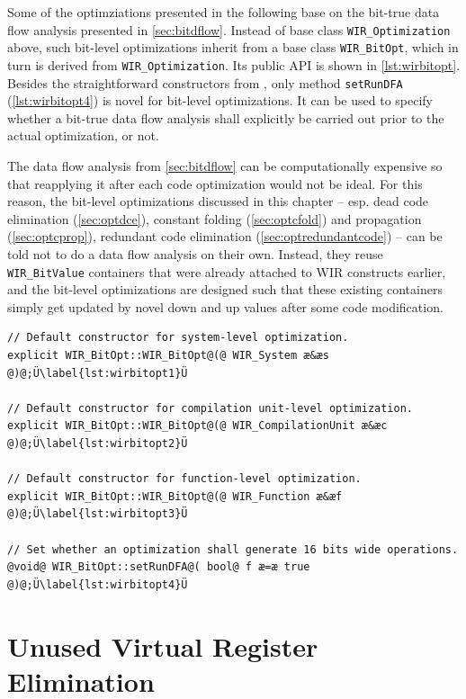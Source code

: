 Some of the optimziations presented in the following base on the bit-true data flow analysis presented in \cref{sec:bitdflow}.
Instead of base class \texttt{WIR\_Optimization} above, such bit-level optimizations inherit from a base class \texttt{WIR\_BitOpt}, which in turn is derived from \texttt{WIR\_Optimization}.
Its public \gls{API} is shown in \cref{lst:wirbitopt}.
Besides the straightforward constructors from , only method \texttt{setRunDFA} (\cref{lst:wirbitopt4}) is novel for bit-level optimizations.
It can be used to specify whether a bit-true data flow analysis shall explicitly be carried out prior to the actual optimization, or not.

The data flow analysis from \cref{sec:bitdflow} can be computationally expensive so that reapplying it after each code optimization would not be ideal.
For this reason, the bit-level optimizations discussed in this chapter -- esp. dead code elimination (\cref{sec:optdce}), constant folding (\cref{sec:optcfold}) and propagation (\cref{sec:optcprop}), redundant code elimination (\cref{sec:optredundantcode}) -- can be told not to do a data flow analysis on their own.
Instead, they reuse \texttt{WIR\_BitValue} containers that were already attached to \gls{WIR} constructs earlier, and the bit-level optimizations are designed such that these existing containers simply get updated by novel down and up values after some code modification.

\begin{lstlisting}[style=code,float=t,caption={Bit-Level Optimization API of Class \texttt{WIR\_BitOpt}},label=lst:wirbitopt]
// Default constructor for system-level optimization.
explicit WIR_BitOpt::WIR_BitOpt@(@ WIR_System æ&æs @)@;Ü\label{lst:wirbitopt1}Ü

// Default constructor for compilation unit-level optimization.
explicit WIR_BitOpt::WIR_BitOpt@(@ WIR_CompilationUnit æ&æc @)@;Ü\label{lst:wirbitopt2}Ü

// Default constructor for function-level optimization.
explicit WIR_BitOpt::WIR_BitOpt@(@ WIR_Function æ&æf @)@;Ü\label{lst:wirbitopt3}Ü

// Set whether an optimization shall generate 16 bits wide operations.
@void@ WIR_BitOpt::setRunDFA@( bool@ f æ=æ true @)@;Ü\label{lst:wirbitopt4}Ü
\end{lstlisting}


\section{Unused Virtual Register Elimination}
\label{sec:optvregs}

